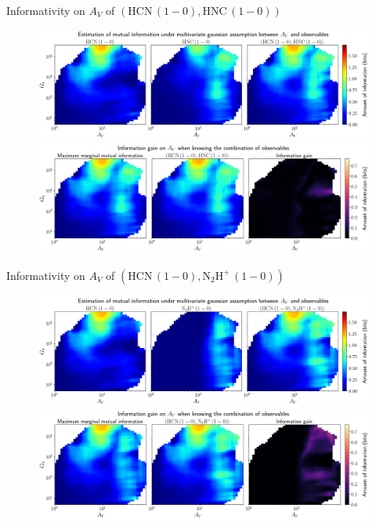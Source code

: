 \documentclass{beamer}
\begin{document}
\begin{frame}{Informativity on $A_V$ of $\left(\mathrm{HCN\,(1-0)},\mathrm{HNC\,(1-0)}\right)$}
    \begin{figure}
        \centering
        \includegraphics[width=0.95\linewidth]{../linearinfo/av__hcn10_hnc10_linearinfo.png}
        \vfill
        \includegraphics[width=0.95\linewidth]{../linearinfo/av__hcn10_hnc10_linearinfo_gain.png}
    \end{figure}
\end{frame}

\begin{frame}{Informativity on $A_V$ of $\left(\mathrm{HCN\,(1-0)},\mathrm{N_2H^+\,(1-0)}\right)$}
    \begin{figure}
        \centering
        \includegraphics[width=0.95\linewidth]{../linearinfo/av__hcn10_n2hp10_linearinfo.png}
        \vfill
        \includegraphics[width=0.95\linewidth]{../linearinfo/av__hcn10_n2hp10_linearinfo_gain.png}
    \end{figure}
\end{frame}
\end{document}

